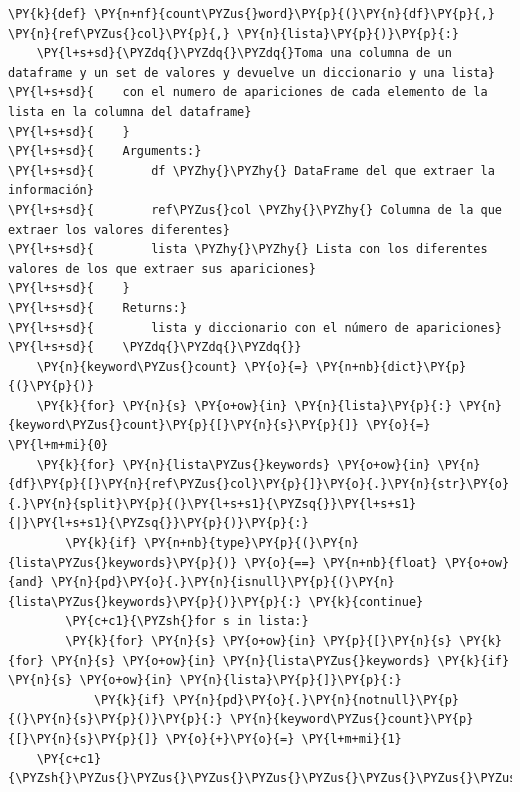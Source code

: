     \begin{tcolorbox}[breakable, size=fbox, boxrule=1pt, pad at break*=1mm,colback=cellbackground, colframe=cellborder]
\begin{Verbatim}[commandchars=\\\{\}]
\PY{k}{def} \PY{n+nf}{count\PYZus{}word}\PY{p}{(}\PY{n}{df}\PY{p}{,} \PY{n}{ref\PYZus{}col}\PY{p}{,} \PY{n}{lista}\PY{p}{)}\PY{p}{:}
    \PY{l+s+sd}{\PYZdq{}\PYZdq{}\PYZdq{}Toma una columna de un dataframe y un set de valores y devuelve un diccionario y una lista}
\PY{l+s+sd}{    con el numero de apariciones de cada elemento de la lista en la columna del dataframe}
\PY{l+s+sd}{    }
\PY{l+s+sd}{    Arguments:}
\PY{l+s+sd}{        df \PYZhy{}\PYZhy{} DataFrame del que extraer la información}
\PY{l+s+sd}{        ref\PYZus{}col \PYZhy{}\PYZhy{} Columna de la que extraer los valores diferentes}
\PY{l+s+sd}{        lista \PYZhy{}\PYZhy{} Lista con los diferentes valores de los que extraer sus apariciones}
\PY{l+s+sd}{    }
\PY{l+s+sd}{    Returns:}
\PY{l+s+sd}{        lista y diccionario con el número de apariciones}
\PY{l+s+sd}{    \PYZdq{}\PYZdq{}\PYZdq{}}
    \PY{n}{keyword\PYZus{}count} \PY{o}{=} \PY{n+nb}{dict}\PY{p}{(}\PY{p}{)}
    \PY{k}{for} \PY{n}{s} \PY{o+ow}{in} \PY{n}{lista}\PY{p}{:} \PY{n}{keyword\PYZus{}count}\PY{p}{[}\PY{n}{s}\PY{p}{]} \PY{o}{=} \PY{l+m+mi}{0}
    \PY{k}{for} \PY{n}{lista\PYZus{}keywords} \PY{o+ow}{in} \PY{n}{df}\PY{p}{[}\PY{n}{ref\PYZus{}col}\PY{p}{]}\PY{o}{.}\PY{n}{str}\PY{o}{.}\PY{n}{split}\PY{p}{(}\PY{l+s+s1}{\PYZsq{}}\PY{l+s+s1}{|}\PY{l+s+s1}{\PYZsq{}}\PY{p}{)}\PY{p}{:}
        \PY{k}{if} \PY{n+nb}{type}\PY{p}{(}\PY{n}{lista\PYZus{}keywords}\PY{p}{)} \PY{o}{==} \PY{n+nb}{float} \PY{o+ow}{and} \PY{n}{pd}\PY{o}{.}\PY{n}{isnull}\PY{p}{(}\PY{n}{lista\PYZus{}keywords}\PY{p}{)}\PY{p}{:} \PY{k}{continue}
        \PY{c+c1}{\PYZsh{}for s in lista:}
        \PY{k}{for} \PY{n}{s} \PY{o+ow}{in} \PY{p}{[}\PY{n}{s} \PY{k}{for} \PY{n}{s} \PY{o+ow}{in} \PY{n}{lista\PYZus{}keywords} \PY{k}{if} \PY{n}{s} \PY{o+ow}{in} \PY{n}{lista}\PY{p}{]}\PY{p}{:}
            \PY{k}{if} \PY{n}{pd}\PY{o}{.}\PY{n}{notnull}\PY{p}{(}\PY{n}{s}\PY{p}{)}\PY{p}{:} \PY{n}{keyword\PYZus{}count}\PY{p}{[}\PY{n}{s}\PY{p}{]} \PY{o}{+}\PY{o}{=} \PY{l+m+mi}{1}
    \PY{c+c1}{\PYZsh{}\PYZus{}\PYZus{}\PYZus{}\PYZus{}\PYZus{}\PYZus{}\PYZus{}\PYZus{}\PYZus{}\PYZus{}\PYZus{}\PYZus{}\PYZus{}\PYZus{}\PYZus{}\PYZus{}\PYZus{}\PYZus{}\PYZus{}\PYZus{}\PYZus{}\PYZus{}\PYZus{}\PYZus{}\PYZus{}\PYZus{}\PYZus{}\PYZus{}\PYZus{}\PYZus{}\PYZus{}\PYZus{}\PYZus{}\PYZus{}\PYZus{}\PYZus{}\PYZus{}\PYZus{}\PYZus{}\PYZus{}\PYZus{}\PYZus{}\PYZus{}\PYZus{}\PYZus{}\PYZus{}\PYZus{}\PYZus{}\PYZus{}\PYZus{}\PYZus{}\PYZus{}\PYZus{}\PYZus{}\PYZus{}\PYZus{}\PYZus{}\PYZus{}\PYZus{}\PYZus{}\PYZus{}\PYZus{}\PYZus{}\PYZus{}\PYZus{}\PYZus{}\PYZus{}\PYZus{}\PYZus{}\PYZus{}}

\end{Verbatim}
\end{tcolorbox}
